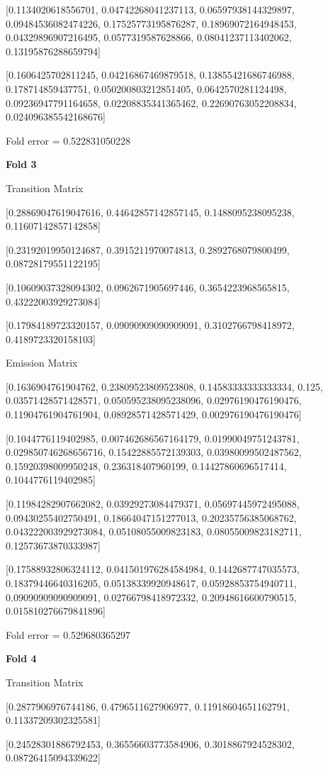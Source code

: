 \documentclass{article}
\begin{document}
[0.1134020618556701, 0.04742268041237113, 0.06597938144329897, 0.09484536082474226, 0.17525773195876287, 0.18969072164948453, 0.04329896907216495, 0.0577319587628866, 0.08041237113402062, 0.13195876288659794]

[0.1606425702811245, 0.04216867469879518, 0.13855421686746988, 0.178714859437751, 0.050200803212851405, 0.0642570281124498, 0.09236947791164658, 0.02208835341365462, 0.22690763052208834, 0.024096385542168676]

Fold error = 0.522831050228

\textbf{Fold 3}

Transition Matrix

[0.28869047619047616, 0.44642857142857145, 0.1488095238095238, 0.11607142857142858]

[0.23192019950124687, 0.3915211970074813, 0.2892768079800499, 0.08728179551122195]

[0.10609037328094302, 0.0962671905697446, 0.3654223968565815, 0.43222003929273084]

[0.17984189723320157, 0.09090909090909091, 0.3102766798418972, 0.4189723320158103]

Emission Matrix

[0.1636904761904762, 0.23809523809523808, 0.14583333333333334, 0.125, 0.03571428571428571, 0.050595238095238096, 0.02976190476190476, 0.11904761904761904, 0.08928571428571429, 0.002976190476190476]

[0.1044776119402985, 0.007462686567164179, 0.01990049751243781, 0.029850746268656716, 0.15422885572139303, 0.03980099502487562, 0.15920398009950248, 0.236318407960199, 0.14427860696517414, 0.1044776119402985]

[0.11984282907662082, 0.03929273084479371, 0.05697445972495088, 0.09430255402750491, 0.18664047151277013, 0.20235756385068762, 0.043222003929273084, 0.05108055009823183, 0.08055009823182711, 0.12573673870333987]

[0.17588932806324112, 0.041501976284584984, 0.1442687747035573, 0.18379446640316205, 0.05138339920948617, 0.05928853754940711, 0.09090909090909091, 0.02766798418972332, 0.20948616600790515, 0.015810276679841896]

Fold error = 0.529680365297

\textbf{Fold 4}

Transition Matrix

[0.2877906976744186, 0.4796511627906977, 0.11918604651162791, 0.11337209302325581]

[0.24528301886792453, 0.36556603773584906, 0.3018867924528302, 0.08726415094339622]
\end{document}
